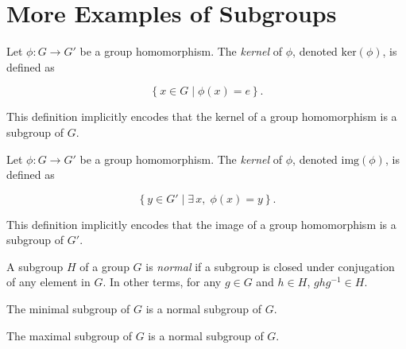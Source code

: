 \section{More Examples of Subgroups}

\begin{definition}
    \label{definition : Kernel}
    \leanok
    Let $\phi : G \rightarrow G'$ be a group homomorphism. The \textit{kernel} of $\phi$, denoted $\text{ker}(\phi)$, is defined as

    $$\left\{ x \in G \middle| \phi(x) = e \right\}.$$

    This definition implicitly encodes that the kernel of a group homomorphism is a subgroup of $G$.
\end{definition}

\begin{definition}
    \label{definition : Image}
    \leanok
    Let $\phi : G \rightarrow G'$ be a group homomorphism. The \textit{kernel} of $\phi$, denoted $\text{img}(\phi)$, is defined as

    $$\left\{ y \in G' \middle| \exists\,x,\;\phi(x) = y \right\}.$$

    This definition implicitly encodes that the image of a group homomorphism is a subgroup of $G'$.
\end{definition}

\begin{definition}
    \label{definition : normal}
    \leanok
    A subgroup $H$ of a group $G$ is \textit{normal} if a subgroup is closed under conjugation of any element in $G$. In other terms, for any $g \in G$ and $h \in H$, $ghg^{-1} \in H$.
\end{definition}

\begin{theorem}
    \label{theorem : Minimal_normal}
    \leanok
    The minimal subgroup of $G$ is a normal subgroup of $G$.
\end{theorem}

\begin{theorem}
    \label{theorem : Maximal_normal}
    \leanok
    The maximal subgroup of $G$ is a normal subgroup of $G$.
\end{theorem}

